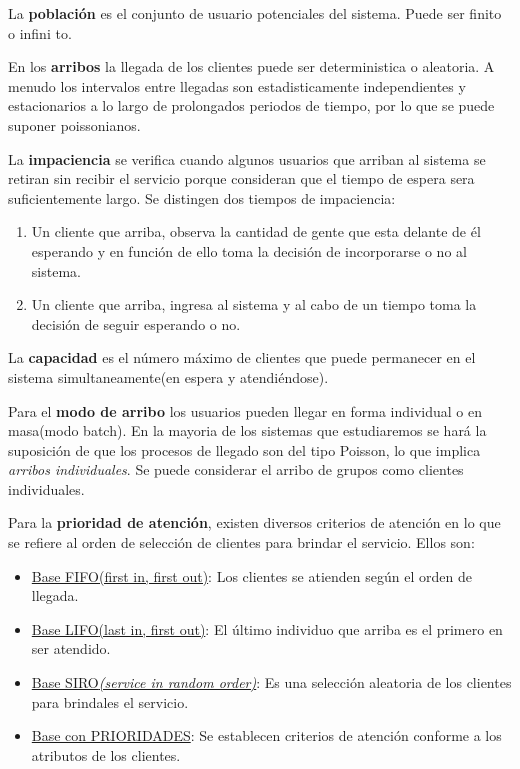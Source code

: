 \documentclass{article}
\begin{document}
La \textbf{población} es el conjunto de usuario potenciales del sistema. Puede ser finito o infini  to.

En los \textbf{arribos} la llegada de los clientes puede ser deterministica o aleatoria. A menudo los intervalos entre llegadas son estadisticamente independientes y estacionarios a lo largo de prolongados periodos de tiempo, por lo que se puede suponer poissonianos.

La \textbf{impaciencia} se verifica cuando algunos usuarios que arriban al sistema se retiran sin recibir el servicio porque consideran que el tiempo de espera sera suficientemente largo. Se distingen dos tiempos de impaciencia:
\begin{enumerate}
    \item Un cliente que arriba, observa la cantidad de gente que esta delante de él esperando y en función de ello toma la decisión de incorporarse o no al sistema.
    \item Un cliente que arriba, ingresa al sistema y al cabo de un tiempo toma la decisión de seguir esperando o no.
\end{enumerate}

La \textbf{capacidad} es el número máximo de clientes que puede permanecer en el sistema simultaneamente(en espera y atendiéndose).

Para el \textbf{modo de arribo} los usuarios pueden llegar en forma individual o en masa(modo batch). En la mayoria de los sistemas que estudiaremos se hará la suposición de que los procesos de llegado son del tipo Poisson, lo que implica \textit{arribos individuales}. Se puede considerar el arribo de grupos como clientes individuales. 

Para la \textbf{prioridad de atención}, existen diversos criterios de atención en lo que se refiere al orden de selección de clientes para brindar el servicio. Ellos son:

\begin{itemize}
    \item \underline{Base FIFO{(first in, first out)}}: Los clientes se atienden según el orden de llegada.
    \item \underline{Base LIFO{(last in, first out)}}: El último individuo que arriba es el primero en ser atendido.
    \item \underline{Base SIRO\textit{(service in random order)}}: Es una selección aleatoria de los clientes para brindales el servicio. 
    \item \underline{Base con PRIORIDADES}: Se establecen criterios de atención conforme a los atributos de los clientes. 
\end{itemize}
\end{document}
